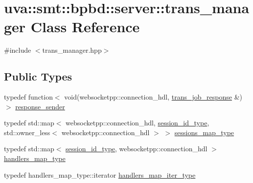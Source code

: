 \hypertarget{classuva_1_1smt_1_1bpbd_1_1server_1_1trans__manager}{}\section{uva\+:\+:smt\+:\+:bpbd\+:\+:server\+:\+:trans\+\_\+manager Class Reference}
\label{classuva_1_1smt_1_1bpbd_1_1server_1_1trans__manager}


{\ttfamily \#include $<$trans\+\_\+manager.\+hpp$>$}

\subsection*{Public Types}
\begin{DoxyCompactItemize}
\item 
typedef function$<$ void(websocketpp\+::connection\+\_\+hdl, \hyperlink{classuva_1_1smt_1_1bpbd_1_1common_1_1messaging_1_1trans__job__response}{trans\+\_\+job\+\_\+response} \&) $>$ \hyperlink{classuva_1_1smt_1_1bpbd_1_1server_1_1trans__manager_ac7a3a0d2d4e7d21b2ce55161bf84f53e}{response\+\_\+sender}
\item 
typedef std\+::map$<$ websocketpp\+::connection\+\_\+hdl, \hyperlink{namespaceuva_1_1smt_1_1bpbd_1_1common_1_1messaging_a17ad17f94b78abb87ab5f3f3d6f09588}{session\+\_\+id\+\_\+type}, std\+::owner\+\_\+less$<$ websocketpp\+::connection\+\_\+hdl $>$ $>$ \hyperlink{classuva_1_1smt_1_1bpbd_1_1server_1_1trans__manager_aea69500c7a8a6bcb5b2035a684537bcb}{sessions\+\_\+map\+\_\+type}
\item 
typedef std\+::map$<$ \hyperlink{namespaceuva_1_1smt_1_1bpbd_1_1common_1_1messaging_a17ad17f94b78abb87ab5f3f3d6f09588}{session\+\_\+id\+\_\+type}, websocketpp\+::connection\+\_\+hdl $>$ \hyperlink{classuva_1_1smt_1_1bpbd_1_1server_1_1trans__manager_ad5d869b7da9455a2903c5682dde5bcfe}{handlers\+\_\+map\+\_\+type}
\item 
typedef handlers\+\_\+map\+\_\+type\+::iterator \hyperlink{classuva_1_1smt_1_1bpbd_1_1server_1_1trans__manager_adec62cec51f0ade28dbf9311b3a3b4ad}{handlers\+\_\+map\+\_\+iter\+\_\+type}
\end{DoxyCompactItemize}
